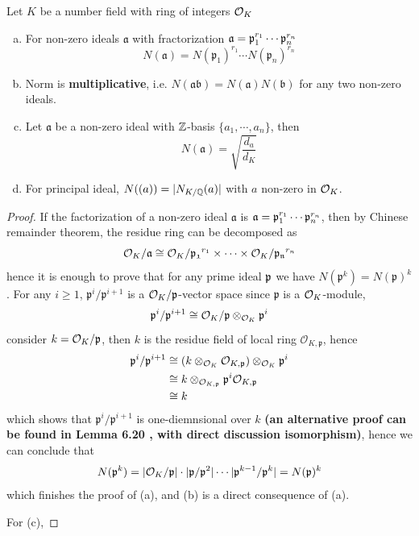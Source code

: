\begin{colorproposition}
    Let \(K\) be a number field with ring of integers \(\mathcal{O}_K\)
    \begin{enumerate} [(a)]
        \item For non-zero ideals \(\mathfrak{a}\) with fractorization \(\mathfrak{a} = \mathfrak{p}_1^{r_1} \cdots \mathfrak{p}_n^{r_n}\)
        \[N(\mathfrak{a}) = N(\mathfrak{p}_1)^{r_1} \cdots N(\mathfrak{p}_n)^{r_n}\]
        \item Norm is \textbf{multiplicative}, i.e. \(N(\mathfrak{ab}) = N(\mathfrak{a})N(\mathfrak{b})\) for any two non-zero ideals.
        \item Let \(\mathfrak{a}\) be a non-zero ideal with \(\mathbb{Z}\)-basis \(\{a_1,\cdots,a_n\}\), then
        \[N(\mathfrak{a})= \sqrt{\frac{d_{a}}{d_K}}\]
        \item For principal ideal, \(N((a)) = |N_{K/\mathbb{Q}}(a)|\) with \(a \) non-zero in \(\mathcal{O}_K\).
    \end{enumerate}
\end{colorproposition}
\begin{proof}
    If the factorization of a non-zero ideal \(\mathfrak{a}\) is \(\mathfrak{a} = \mathfrak{p}_1^{r_1} \cdots \mathfrak{p}_n^{r_n}\), then by Chinese remainder theorem, the residue ring can be decomposed as
\[\mathcal{O}_K/\mathfrak{a} \cong \mathcal{O}_K/\mathfrak{p_1}^{r_1} \times \cdots \times \mathcal{O}_K/\mathfrak{p_n}^{r_n}\]
hence it is enough to prove that for any prime ideal \(\mathfrak{p}\) we have \(N(\mathfrak{p}^k) = N(\mathfrak{p})^k\). For any \(i \geq 1\), \(\mathfrak{p}^i/\mathfrak{p}^{i+1}\) is a \(\mathcal{O}_K/\mathfrak{p}\)-vector space since \(\mathfrak{p}\) is a \(\mathcal{O}_K\)-module,
\[\mathfrak{p}^i/\mathfrak{p}^{i+1}\cong \mathcal{O}_K/\mathfrak{p}\otimes_{\mathcal{O}_K} \mathfrak{p}^i \]
consider \(k = \mathcal{O}_K/\mathfrak{p}\), then \(k\) is the residue field of local ring \(\mathcal{O}_{K,\mathfrak{p}}\), hence 
\begin{align*}
    \mathfrak{p}^i/\mathfrak{p}^{i+1} &\cong (k \otimes_{\mathcal{O}_K} \mathcal{O}_{K,\mathfrak{p}}) \otimes_{\mathcal{O}_K} \mathfrak{p}^i \\
    &\cong k \otimes_{\mathcal{O}_{K,\mathfrak{p}}} \mathfrak{p}^i \mathcal{O}_{K,\mathfrak{p}} \\
    &\cong k
\end{align*}
which shows that \(\mathfrak{p}^i/\mathfrak{p}^{i+1}\) is one-diemnsional over \(k\) \textbf{(an alternative proof can be found in \cite{Tall} Lemma 6.20 , with direct discussion isomorphism)}, hence we can conclude that
\[N(\mathfrak{p}^k) = |\mathcal{O}_K/\mathfrak{p}|\cdot|\mathfrak{p}/\mathfrak{p}^2|\cdots |\mathfrak{p}^{k-1}/\mathfrak{p}^k| = N(\mathfrak{p})^k\]
which finishes the proof of (a), and (b) is a direct consequence of (a).

For (c), 
\end{proof}



